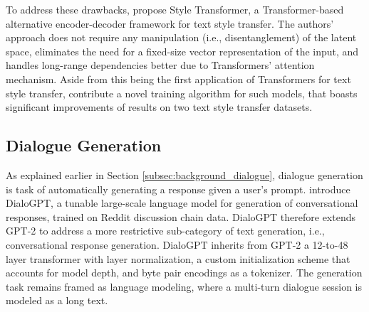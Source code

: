 
To address these drawbacks, \cite{dai2019style} propose Style Transformer, a Transformer-based alternative encoder-decoder framework for text style transfer. The authors' approach does not require any manipulation (i.e., disentanglement) of the latent space, eliminates the need for a fixed-size vector representation of the input, and handles long-range dependencies better due to Transformers' attention mechanism. Aside from this being the first application of Transformers for text style transfer, \cite{dai2019style} contribute a novel training algorithm for such models, that boasts significant improvements of results on two text style transfer datasets.

\subsection{Dialogue Generation}
As explained earlier in Section \ref{subsec:background_dialogue}, dialogue generation is task of automatically generating a response given a user's prompt. \cite{zhang2019dialogpt} introduce DialoGPT, a tunable large-scale language model for generation of conversational responses, trained on Reddit discussion chain data. DialoGPT therefore extends GPT-2 \citep{radford2019language} to address a more restrictive sub-category of text generation, i.e., conversational response generation. DialoGPT inherits from GPT-2 a 12-to-48 layer transformer with layer normalization, a custom initialization scheme that accounts for model depth, and byte pair encodings \citep{sennrich-etal-2016-neural} as a tokenizer. The generation task remains framed as language modeling, where a multi-turn dialogue session is modeled as a long text. 

